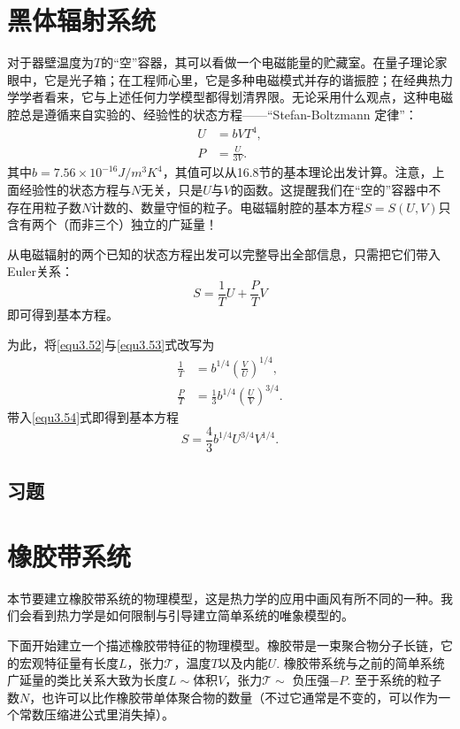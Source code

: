 \section{黑体辐射系统}
\label{sec3.6}
对于器壁温度为$T$的“空”容器，其可以看做一个电磁能量的贮藏室。在量子理论家眼中，它是光子箱；在工程师心里，它是多种电磁模式并存的谐振腔；在经典热力学学者看来，它与上述任何力学模型都得划清界限。无论采用什么观点，这种电磁腔总是遵循来自实验的、经验性的状态方程——“Stefan-Boltzmann 定律”：
\begin{align}
    U &= bVT^4, \label{equ3.52} \\
    P &= \frac{U}{3V}. \label{equ3.53}
\end{align}
其中$b = 7.56 \times 10^{-16} \si{J / m^3 K^4}$，其值可以从16.8节的基本理论出发计算。注意，上面经验性的状态方程与$N$无关，只是$U$与$V$的函数。这提醒我们在“空的”容器中不存在用粒子数$N$计数的、数量守恒的粒子。电磁辐射腔的基本方程$S = S(U, V)$只含有两个（而非三个）独立的广延量！

从电磁辐射的两个已知的状态方程出发可以完整导出全部信息，只需把它们带入Euler关系：
\begin{equation}
    S = \frac{1}{T} U + \frac{P}{T} V
    \label{equ3.54}
\end{equation}
即可得到基本方程。

为此，将\eqref{equ3.52}与\eqref{equ3.53}式改写为
\begin{align}
    \frac{1}{T} &= b^{1/4} \left( \frac{V}{U} \right)^{1/4}, \label{equ3.55} \\
    \frac{P}{T} &= \frac{1}{3} b^{1/4} \left( \frac{U}{V} \right)^{3/4}. \label{equ3.56}
\end{align}
带入\eqref{equ3.54}式即得到基本方程
\begin{equation}
    S = \frac{4}{3} b^{1/4} U^{3/4} V^{1/4}.
\label{equ3.57}
\end{equation}

\subsection*{习题}


\section{橡胶带系统}
\label{sec3.7}
本节要建立橡胶带系统的物理模型，这是热力学的应用中画风有所不同的一种。我们会看到热力学是如何限制与引导建立简单系统的唯象模型的。

下面开始建立一个描述橡胶带特征的物理模型。橡胶带是一束聚合物分子长链，它的宏观特征量有长度$L$，张力$\mathscr{T}$，温度$T$以及内能$U$. 橡胶带系统与之前的简单系统广延量的类比关系大致为长度$L \sim $体积$V$，张力$\mathscr{T} \sim$ 负压强$-P$. 至于系统的粒子数$N$，也许可以比作橡胶带单体聚合物的数量（不过它通常是不变的，可以作为一个常数压缩进公式里消失掉）。

